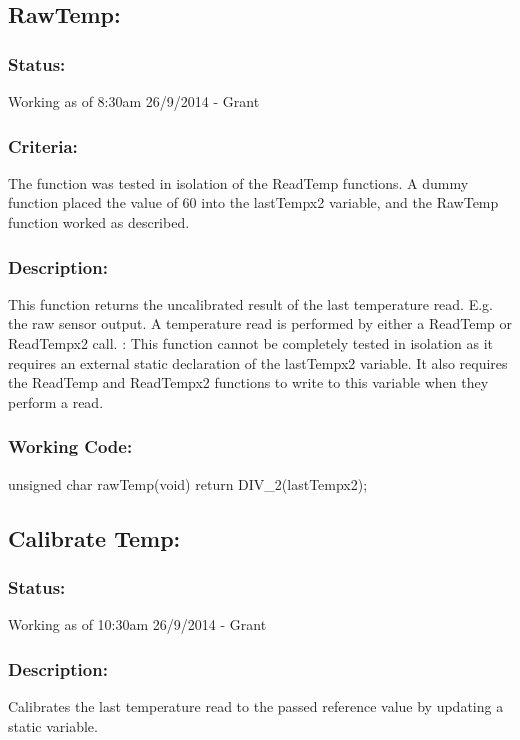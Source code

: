 \documentclass[]{article}
\begin{document}
\subsection{RawTemp:}

\subsubsection{Status:}
Working as of 8:30am 26/9/2014 - Grant

\subsubsection{Criteria:}
The function was tested in isolation of the ReadTemp functions. A dummy function placed the value of 60 into the lastTempx2 variable, and the RawTemp function worked as described.

\subsubsection{Description:}
This function returns the uncalibrated result of the last temperature read. E.g. the raw sensor output. A temperature read is performed by either a ReadTemp or ReadTempx2 call. \newline:
This function cannot be completely tested in isolation as it requires an external static declaration of the lastTempx2 variable. It also requires the ReadTemp and ReadTempx2 functions to write to this variable when they perform a read.

\subsubsection{Working Code:}
unsigned char rawTemp(void)
{
	return DIV\_2(lastTempx2);
} 

\subsection{Calibrate Temp:}
\subsubsection{Status:}
Working as of 10:30am 26/9/2014 - Grant

\subsubsection{Description:}
Calibrates the last temperature read to the passed reference value by updating a static variable.
\end{document}

